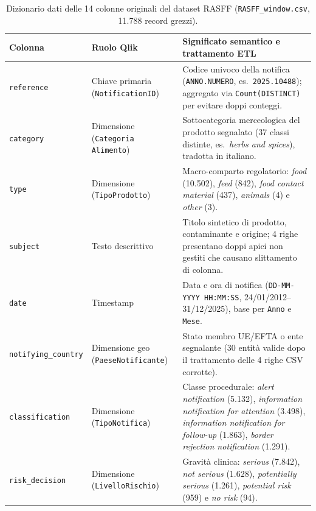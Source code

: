 \begin{table}[H]
\centering
\caption{Dizionario dati delle 14 colonne originali del dataset RASFF (\texttt{RASFF\_window.csv}, 11.788 record grezzi).}
\label{tab:rasff_data_dictionary}
\footnotesize
\setlength{\tabcolsep}{4pt}
\begin{tabularx}{\textwidth}{@{}>{\raggedright\arraybackslash}p{2.9cm}>{\raggedright\arraybackslash}p{2.8cm}>{\raggedright\arraybackslash}X@{}}
\toprule
\rowcolors{1}{white}{gray!15}

\textbf{Colonna} & \textbf{Ruolo Qlik} & \textbf{Significato semantico e trattamento ETL} \\
\midrule
\texttt{reference} & Chiave primaria (\texttt{NotificationID}) & Codice univoco della notifica (\texttt{ANNO.NUMERO}, es.\ \texttt{2025.10488}); aggregato via \texttt{Count(DISTINCT)} per evitare doppi conteggi. \\
\texttt{category} & Dimensione (\texttt{Categoria Alimento}) & Sottocategoria merceologica del prodotto segnalato (37 classi distinte, es.\ \textit{herbs and spices}), tradotta in italiano. \\
\texttt{type} & Dimensione (\texttt{TipoProdotto}) & Macro-comparto regolatorio: \textit{food} (10.502), \textit{feed} (842), \textit{food contact material} (437), \textit{animals} (4) e \textit{other} (3). \\
\texttt{subject} & Testo descrittivo & Titolo sintetico di prodotto, contaminante e origine; 4 righe presentano doppi apici non gestiti che causano slittamento di colonna. \\
\texttt{date} & Timestamp & Data e ora di notifica (\texttt{DD-MM-YYYY HH:MM:SS}, 24/01/2012--31/12/2025), base per \texttt{Anno} e \texttt{Mese}. \\
\texttt{notifying\_country} & Dimensione geo (\texttt{PaeseNotificante}) & Stato membro UE/EFTA o ente segnalante (30 entità valide dopo il trattamento delle 4 righe CSV corrotte). \\
\texttt{classification} & Dimensione (\texttt{TipoNotifica}) & Classe procedurale: \textit{alert notification} (5.132), \textit{information notification for attention} (3.498), \textit{information notification for follow-up} (1.863), \textit{border rejection notification} (1.291). \\
\texttt{risk\_decision} & Dimensione (\texttt{LivelloRischio}) & Gravità clinica: \textit{serious} (7.842), \textit{not serious} (1.628), \textit{potentially serious} (1.261), \textit{potential risk} (959) e \textit{no risk} (94). \\

\end{tabularx}
\end{table}
